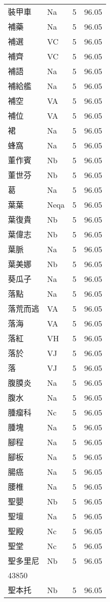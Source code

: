 \documentclass[twocolumn]{book}
\begin{document}
\begin{supertabular}{llrr}
裝甲車 & Na & 5 &  96.05\\
補藥 & Na & 5 &  96.05\\
補選 & VC & 5 &  96.05\\
補齊 & VC & 5 &  96.05\\
補語 & Na & 5 &  96.05\\
補給艦 & Na & 5 &  96.05\\
補空 & VA & 5 &  96.05\\
補位 & VA & 5 &  96.05\\
裙 & Na & 5 &  96.05\\
蜂窩 & Na & 5 &  96.05\\
董作賓 & Nb & 5 &  96.05\\
董世芬 & Nb & 5 &  96.05\\
葛 & Na & 5 &  96.05\\
葉葉 & Neqa & 5 &  96.05\\
葉復貴 & Nb & 5 &  96.05\\
葉偉志 & Nb & 5 &  96.05\\
葉脈 & Na & 5 &  96.05\\
葉美娜 & Nb & 5 &  96.05\\
葵瓜子 & Na & 5 &  96.05\\
落點 & Na & 5 &  96.05\\
落荒而逃 & VA & 5 &  96.05\\
落海 & VA & 5 &  96.05\\
落紅 & VH & 5 &  96.05\\
落於 & VJ & 5 &  96.05\\
落 & VJ & 5 &  96.05\\
腹膜炎 & Na & 5 &  96.05\\
腹水 & Na & 5 &  96.05\\
腫瘤科 & Nc & 5 &  96.05\\
腫塊 & Na & 5 &  96.05\\
腳程 & Na & 5 &  96.05\\
腳板 & Na & 5 &  96.05\\
腸癌 & Na & 5 &  96.05\\
腰椎 & Na & 5 &  96.05\\
聖嬰 & Nb & 5 &  96.05\\
聖壇 & Na & 5 &  96.05\\
聖殿 & Nc & 5 &  96.05\\
聖堂 & Nc & 5 &  96.05\\
聖多里尼 & Nb & 5 &  96.05\\
43850\\
聖本托 & Nb & 5 &  96.05\\

\end{supertabular}
\end{document}
